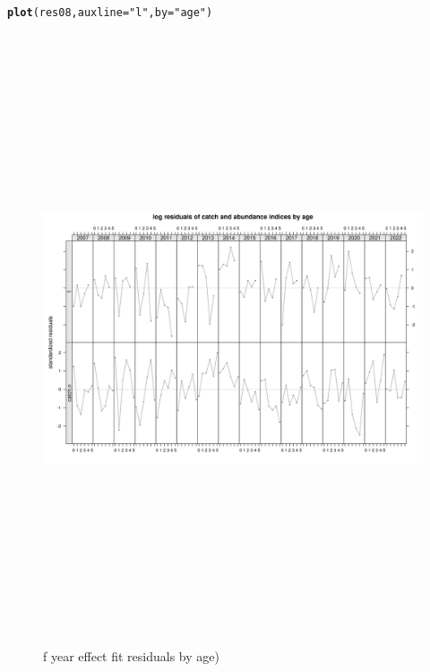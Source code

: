 \documentclass[a4paper,english,11pt]{article}\usepackage[]{graphicx}\usepackage[]{xcolor}
\makeatletter
\newcommand{\hlsng}[1]{\textcolor[rgb]{0.192,0.494,0.8}{#1}}%
\newcommand{\hldef}[1]{\textcolor[rgb]{0.345,0.345,0.345}{#1}}%
\newcommand{\hlkwc}[1]{\textcolor[rgb]{0.333,0.667,0.333}{#1}}%
\newcommand{\hlkwd}[1]{\textcolor[rgb]{0.737,0.353,0.396}{\textbf{#1}}}%
\newenvironment{kframe}{%
 \def\at@end@of@kframe{}%
 \ifinner\ifhmode%
  \def\at@end@of@kframe{\end{minipage}}%
  \begin{minipage}{\columnwidth}%
 \fi\fi%
 \def\FrameCommand##1{\hskip\@totalleftmargin \hskip-\fboxsep
 \colorbox{shadecolor}{##1}\hskip-\fboxsep
     \hskip-\linewidth \hskip-\@totalleftmargin \hskip\columnwidth}%
 \MakeFramed {\advance\hsize-\width
   \@totalleftmargin\z@ \linewidth\hsize
   \@setminipage}}%
 {\par\unskip\endMakeFramed%
 \at@end@of@kframe}
\newenvironment{knitrout}{}{} %
\makeatother
\begin{document}
\begin{knitrout}
\color{fgcolor}\begin{kframe}
\begin{alltt}
\hlkwd{plot}\hldef{(res08,} \hlkwc{auxline} \hldef{=} \hlsng{"l"}\hldef{,} \hlkwc{by} \hldef{=} \hlsng{"age"}\hldef{)}
\end{alltt}
\end{kframe}\begin{figure}[H]

{\centering \includegraphics[width=25cm,height=18cm,angle=90]{figure/fksresbyage-1} 

}

\caption[f year effect fit residuals by age)]{f year effect fit residuals by age)}\label{fig:fksresbyage}
\end{figure}

\end{knitrout}
\end{document}
